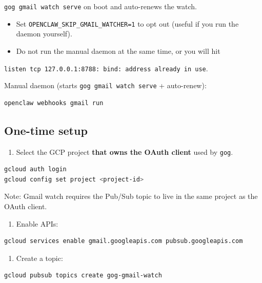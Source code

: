 \texttt{gog gmail watch serve} on boot and auto-renews the watch.
\begin{itemize}
  \item Set \texttt{OPENCLAW\_SKIP\_GMAIL\_WATCHER=1} to opt out (useful if you run the daemon yourself).
  \item Do not run the manual daemon at the same time, or you will hit
\end{itemize}

\texttt{listen tcp 127.0.0.1:8788: bind: address already in use}.

Manual daemon (starts \texttt{gog gmail watch serve} + auto-renew):

\begin{lstlisting}[language=bash]
openclaw webhooks gmail run
\end{lstlisting}


\subsection{One-time setup}


\begin{enumerate}
  \item Select the GCP project \textbf{that owns the OAuth client} used by \texttt{gog}.
\end{enumerate}


\begin{lstlisting}[language=bash]
gcloud auth login
gcloud config set project <project-id>
\end{lstlisting}


Note: Gmail watch requires the Pub/Sub topic to live in the same project as the OAuth client.

\begin{enumerate}
  \item Enable APIs:
\end{enumerate}


\begin{lstlisting}[language=bash]
gcloud services enable gmail.googleapis.com pubsub.googleapis.com
\end{lstlisting}


\begin{enumerate}
  \item Create a topic:
\end{enumerate}


\begin{lstlisting}[language=bash]
gcloud pubsub topics create gog-gmail-watch
\end{lstlisting}


